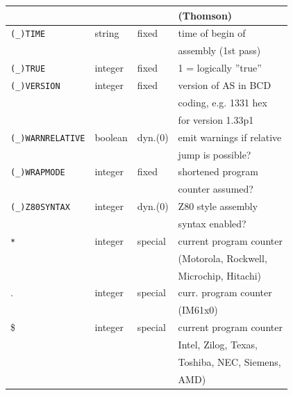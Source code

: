 \documentclass[12pt,twoside]{report}
\newcommand{\asname}{{AS}}
\newcommand{\predefsym}[1]{{\tt (\_)#1}}
\begin{document}
\begin{center}
\begin{longtable}{|l|l|l|l|}
                       &             &            & (Thomson) \\
\hline
\predefsym{TIME}       & string      & fixed      & time of begin of \\
                       &             &            & assembly (1st pass) \\
\hline
\predefsym{TRUE}       & integer     & fixed      & 1 = logically ''true'' \\
\hline
\predefsym{VERSION}    & integer     & fixed      & version of \asname{} in BCD \\
                       &             &            & coding, e.g. 1331 hex \\
                       &             &            & for version 1.33p1 \\
\hline
\predefsym{WARNRELATIVE} & boolean   & dyn.(0)    & emit warnings if relative \\
                       &             &            & jump is possible? \\
\hline
\predefsym{WRAPMODE}   & integer     & fixed      & shortened program \\
                       &             &            & counter assumed? \\
\hline
\predefsym{Z80SYNTAX}  & integer     & dyn.(0)    & Z80 style assembly \\
                       &             &            & syntax enabled? \\
\hline
\verb!*!               & integer     & special    & current program counter \\
                       &             &            & (Motorola, Rockwell, \\
                       &             &            & Microchip, Hitachi) \\
\hline
.                      & integer     & special    & curr. program counter \\
                       &             &            & (IM61x0) \\
\hline
\$                     & integer     & special    & current program counter \\
                       &             &            & Intel, Zilog, Texas, \\
                       &             &            & Toshiba, NEC, Siemens, \\
                       &             &            & AMD) \\
\hline
\end{longtable}\end{center}
\end{document}
